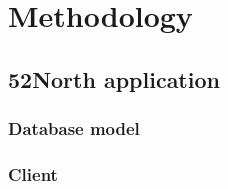 \chapter{Methodology}

\section{52North application}

\subsection{Database model}

\subsection{Client}

